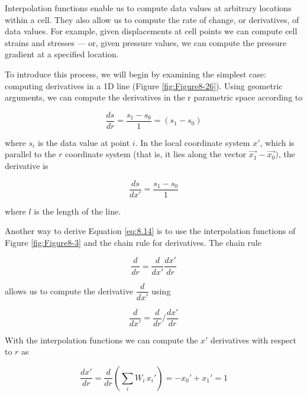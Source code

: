 Interpolation functions enable us to compute data values at arbitrary locations within a cell. They also allow us to compute the rate of change, or derivatives, of data values. For example, given displacements at cell points we can compute cell strains and stresses --- or, given pressure values, we can compute the pressure gradient at a specified location.

To introduce this process, we will begin by examining the simplest case: computing derivatives in a 1D line (Figure \ref{fig:Figure8-26}). Using geometric arguments, we can compute the derivatives in the r parametric space according to

\begin{equation}\label{eq:8.13}
\dfrac{d s}{d r} = \dfrac{s_1 - s_0}{1} = (s_1 - s_0)
\end{equation}

where $s_i$ is the data value at point $i$. In the local coordinate system $x'$, which is parallel to the $r$ coordinate system (that is, it lies along the vector $\overrightarrow{x_1} - \overrightarrow{x_0})$, the derivative is

\begin{equation}\label{eq:8.14}
\dfrac{d s}{d x'} = \dfrac{s_1 - s_0}{1}
\end{equation}

where $l$ is the length of the line.

Another way to derive Equation \ref{eq:8.14} is to use the interpolation functions of Figure \ref{fig:Figure8-3} and the chain rule for derivatives. The chain rule

\begin{equation}\label{eq:8.15}
\dfrac{d}{d r} = \dfrac{d}{dx'} \dfrac{dx'}{dr}
\end{equation}

allows us to compute the derivative $\dfrac{d}{dx'}$ using

\begin{equation}\label{eq:8.16}
\frac{d}{d x'} = \dfrac{d}{dr}/ \dfrac{dx'}{dr}
\end{equation}

With the interpolation functions we can compute the $x'$ derivatives with respect to $r$ as

\begin{equation}\label{eq:8.17}
\frac{d x'}{d r} = \frac{d}{dr} \left(\sum_{i}W_i \, x_i' \right) = -x_0' + x_1' = 1
\end{equation}

